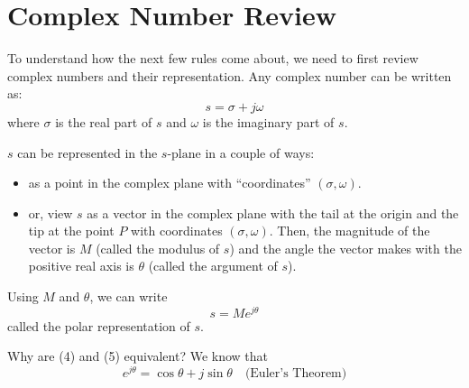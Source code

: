 \documentclass{book}
\newcommand{\jw}{j\omega}
\newcommand{\spl}{s\textrm{-plane}}
\begin{document}
	\section*{Complex Number Review}
	To understand how the next few rules come about, we need to first review complex numbers and their representation. Any complex number can be written as:
	\begin{equation}
	s = \sigma + \jw
	\end{equation}
	where $ \sigma $ is the real part of $ s $ and $ \omega $ is the imaginary part of $ s $.
	
	$ s $ can be represented in the $ \spl $ in a couple of ways:
	\begin{itemize}
		\item as a point in the complex plane with ``coordinates'' $ (\sigma,\omega) $.
		\item or, view $ s $ as a vector in the complex plane with the tail at the origin and the tip at the point $ P $ with coordinates $ (\sigma,\omega) $. Then, the magnitude of the vector is $ M $ (called the modulus of $ s $) and the angle the vector makes with the positive real axis is $ \theta $ (called the argument of $ s $).
	\end{itemize}
	
	\begin{center}
	\end{center}
	
	Using $ M $ and $ \theta $, we can write
	\begin{equation}
	s = Me^{j\theta}
	\end{equation}
	called the polar representation of $ s $.
	
	Why are (4) and (5) equivalent? We know that
	\[
	e^{j\theta}=\cos\theta+j\sin\theta \quad\textrm{(Euler's Theorem)}
	\]
	
\end{document}
